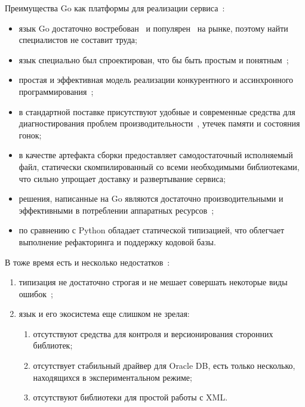 Преимущества Go как платформы для реализации сервиса~\cite{the-pros-and-cons-of-programming-in-go}:
\begin{itemize}
    \item язык Go достаточно востребован~\cite{mostpopularlang2018,itsalaryinmid2018}
    и популярен~\cite{TIOBEIndex}
    на рынке, поэтому найти специалистов не составит труда;
    \item язык специально был спроектирован, что бы быть простым и понятным~\cite{Gogoodbadugly,advpropsGo,WhyGosdesignisadisservicetointelligentprogrammers};
    \item простая и эффективная модель реализации конкурентного и ассинхронного программирования~\cite{hoar1989csp};
    \item в стандартной поставке присутствуют удобные и современные средства для диагностирования проблем производительности~\cite{ProfilingGoPrograms,profilingandoptimizationGo},
    утечек памяти и состояния гонок;
    \item в качестве артефакта сборки предоставляет самодостаточный исполняемый файл,
    статически скомпилированный со всеми необходимыми библиотеками,
    что сильно упрощает доставку и развертывание сервиса;
    \item решения, написанные на Go являются достаточно производительными и эффективными в потреблении аппаратных ресурсов~\cite{HowWeWentfrom30Serversto2Go,millionWebSocketGo,Goinyandex};
    \item по сравнению с Python обладает статической типизацией, что облегчает выполнение рефакторинга и поддержку кодовой базы.
\end{itemize}

В тоже время есть и несколько недостатков~\cite{Gogoodbadugly,50ShadesofGo}:
\begin{enumerate}
    \item типизация не достаточно строгая и не мешает совершать некоторые виды ошибок~\cite{staticlinterGo};
    \item язык и его экосистема еще слишком не зрелая:
    \begin{enumerate}
        \item отсутствуют средства для контроля и версионирования сторонних библиотек;
        \item отсутствует стабильный драйвер для Oracle DB, есть только несколько, находящихся в экспериментальном режиме;
        \item отсутствуют библиотеки для простой работы с XML\@.
    \end{enumerate}
\end{enumerate}

